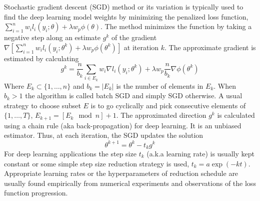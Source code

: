 \documentclass[12pt]{TD-CJS}
\begin{document}
\begin{appendix}\label{SGD}
Stochastic gradient descent (SGD) method or its variation  is typically used to find the deep learning model weights by minimizing the penalized loss function, $\sum_{i=1}^n w_i l_i(y_i; \theta) + \lambda w_{p} \phi(\theta)$. The method minimizes the function by taking a negative step along an estimate $g^k$ of the gradient $\nabla\left[\sum_{i=1}^n w_i l_i(y_i; \theta^k) + \lambda w_{p} \phi(\theta^k)\right] $ at iteration $k$. 
The approximate gradient is estimated by calculating 
\[
g^k = \frac{n}{b_k} \sum_{i \in E_k} w_i\nabla  l_i(y_i; \theta^k) +  \lambda w_{p} \frac{n}{b_k}\nabla \phi(\theta^k)
\]
Where $E_k \subset \{1,\ldots,n \}$ and $b_k = |E_k|$ is the number of elements in $E_k$. When $b_k >1$ the algorithm is called batch SGD and simply SGD otherwise. A usual strategy to choose subset $E$ is to go cyclically and pick consecutive elements of $\{1,\ldots,T \}$, $E_{k+1} = [E_k \mod n]+1$. The approximated direction  $g^k$ is calculated using a chain rule (aka back-propagation) for deep learning. It  is an unbiased estimator. Thus, at each iteration, the SGD updates the solution
\[
\theta^{k+1} = \theta^k - t_k g^k
\]
For deep learning applications the step size $t_k$ (a.k.a learning rate) is usually kept constant or some simple step size reduction strategy is used, $t_k = a\exp(-kt)$. Appropriate learning rates or the hyperparameters of reduction schedule  are usually found empirically from numerical experiments and observations of the loss function progression. \\
\end{appendix}
\end{document}
